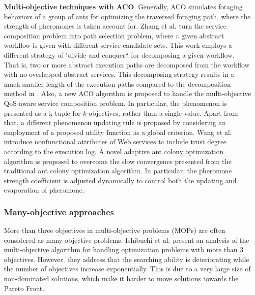 \textbf{Multi-objective techniques with ACO}. Generally, ACO simulates foraging behaviors of a group of ants for optimizing the traversed foraging path, where the strength of pheromones is taken account for. Zhang et al. \cite{zhang2010qos} turn the service composition problem into path selection problem, where a given abstract workflow is given with different service candidate sets. This work employs a different strategy of "divide and conquer`` for decomposing a given workflow. That is,  two or more abstract execution paths are decomposed from the workflow with no overlapped abstract services. This decomposing strategy results in a much smaller length of the execution paths compared to the decomposition method in \cite{yu2007efficient}.  Also, a new ACO algorithm is proposed to handle the multi-objective QoS-aware service composition problem. In particular,  the phenomenon is presented as a k-tuple for $k$ objectives, rather than a single value. Apart from that, a different phenomenon updating rule is proposed by considering an employment of a proposed utility function as a global criterion. Wang et al. \cite{wang2014novel} introduce nonfunctional attributes of Web services to include trust degree according to the execution log. A novel adaptive ant colony optimization algorithm is proposed to overcome the slow convergence presented from the traditional ant colony optimization algorithm. In particular, the pheromone strength coefficient is adjusted dynamically to control both the updating and evaporation of pheromone. 

\subsubsection{Many-objective approaches}\label{ManyObjective}

More than three objectives in multi-objective problems (MOPs) are often considered as many-objective problems. Ishibuchi et al. \cite{ishibuchi2008evolutionary} present an analysis of the multi-objective algorithm for handling optimization problems with more than 3 objectives. However, they address that the searching ability is deteriorating while the number of objectives increase exponentially. This is due to a very large size of non-dominated solutions, which make it harder to move solutions towards the Pareto Front.

